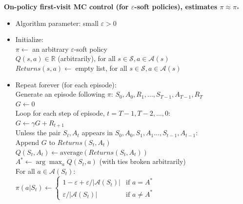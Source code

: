 \textbf{On-policy first-visit MC control (for $\varepsilon$-soft policies), estimates $\pi \approx \pi_*$}
\begin{itemize}[leftmargin=*]
	\item[] Algorithm parameter: small $\varepsilon > 0$
	\item[] Initialize:\\
	      $\pi \leftarrow$ an arbitrary $\varepsilon$-soft policy\\
	      $Q(s, a) \in \mathbb{R}$ (arbitrarily), for all $s \in \mathcal{S}, a \in \mathcal{A}(s)$\\
	      $Returns(s, a) \leftarrow$ empty list, for all $s \in \mathcal{S}, a \in \mathcal{A}(s)$

	\item[] Repeat forever (for each episode):\\
	      Generate an episode following $\pi$: $S_0, A_0, R_1, \ldots, S_{T-1}, A_{T-1}, R_T$\\
	      $G \leftarrow 0$\\
	      Loop for each step of episode, $t = T-1, T-2, \ldots, 0$:\\
	      \hspace*{1em} $G \leftarrow \gamma G + R_{t+1}$\\
	      \hspace*{1em} Unless the pair $S_t, A_t$ appears in $S_0, A_0, S_1, A_1 \ldots, S_{t-1}, A_{t-1}$:\\
	      \hspace*{2em} Append $G$ to $Returns(S_t, A_t)$\\
	      \hspace*{2em} $Q(S_t, A_t) \leftarrow \text{average}(Returns(S_t, A_t))$\\
	      \hspace*{2em} $A^* \leftarrow \arg\max_a Q(S_t, a)$ \hfill (with ties broken arbitrarily)\\
	      \hspace*{2em} For all $a \in \mathcal{A}(S_t)$:\\
	      \hspace*{3em} $\pi(a | S_t) \leftarrow
		      \begin{cases}
			      1 - \varepsilon + \varepsilon / |\mathcal{A}(S_t)| & \text{if } a = A^*    \\
			      \varepsilon / |\mathcal{A}(S_t)|                   & \text{if } a \neq A^*\end{cases}$
\end{itemize}
